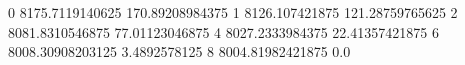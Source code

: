 0 8175.7119140625 170.89208984375
1 8126.107421875 121.28759765625
2 8081.8310546875 77.01123046875
4 8027.2333984375 22.41357421875
6 8008.30908203125 3.4892578125
8 8004.81982421875 0.0
